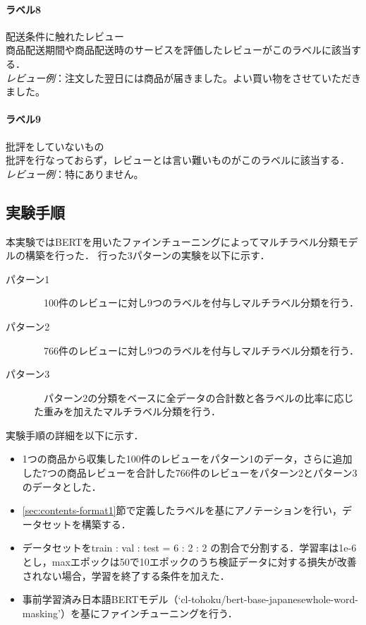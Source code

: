 \documentclass[
  platex, dvipdfmx,  %
]{nlp2024}
\begin{document}
\paragraph{ラベル8} 配送条件に触れたレビュー\\
商品配送期間や商品配送時のサービスを評価したレビューがこのラベルに該当する．\\
\emph{レビュー例}：注文した翌日には商品が届きました。よい買い物をさせていただきました。\\
\paragraph{ラベル9} 批評をしていないもの\\
批評を行なっておらず，レビューとは言い難いものがこのラベルに該当する．\\
\emph{レビュー例}：特にありません。\\
\subsection{実験手順}
本実験ではBERT\cite{Article_06}を用いたファインチューニングによってマルチラベル分類モデルの構築を行った．
行った3パターンの実験を以下に示す．
\begin{description}
 \item[パターン1]　100件のレビューに対し9つのラベルを付与しマルチラベル分類を行う．
 \item[パターン2]　766件のレビューに対し9つのラベルを付与しマルチラベル分類を行う．
 \item[パターン3]　パターン2の分類をベースに全データの合計数と各ラベルの比率に応じた重みを加えたマルチラベル分類を行う．
\end{description}

実験手順の詳細を以下に示す．
\begin{itemize}
  \item 1つの商品から収集した100件のレビューをパターン1のデータ，さらに追加した7つの商品レビューを合計した766件のレビューをパターン2とパターン3のデータとした．
  \item \ref{sec:contents-format1}節で定義したラベルを基にアノテーションを行い，データセットを構築する．
  \item データセットをtrain : val : test = 6 : 2 : 2 の割合で分割する．学習率は1e-6とし，maxエポックは50で10エポックのうち検証データに対する損失が改善されない場合，学習を終了する条件を加えた．
  \item 事前学習済み日本語BERTモデル（`cl-tohoku/bert-base-japanesewhole-word-masking'）を基にファインチューニングを行う．
\end{itemize}
\end{document}
